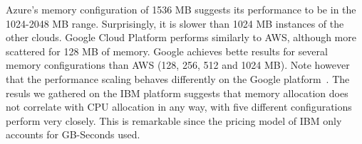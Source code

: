 Azure's memory configuration of 1536 \gls{MB} suggests its performance to be in the 1024-2048 \gls{MB} range.
Surprisingly, it is slower than 1024 \gls{MB} instances of the other clouds.  
Google Cloud Platform performs similarly to \gls{AWS}, although more scattered for 128 \gls{MB} of memory. 
Google achieves bette results for several memory configurations than \gls{AWS} (128, 256, 512 and 1024 \gls{MB}). %
Note however that the performance scaling behaves differently on the Google platform~\cite{GoogleFunctionsPricing}.
The resuls we gathered on the \gls{IBM} platform suggests that memory allocation does not correlate with \gls{CPU} allocation in any way, with five different configurations perform very closely. 
This is remarkable since the pricing model of \gls{IBM} only accounts for GB-Seconds used. 
 

